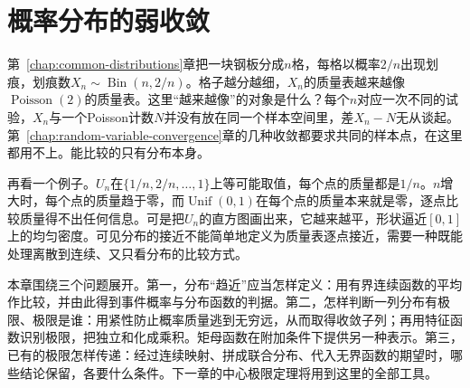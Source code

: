 \chapter{概率分布的弱收敛}
\label{chap:weak-convergence-of-distributions}

第~\ref{chap:common-distributions}章把一块钢板分成$n$格，每格以概率$2/n$出现划痕，划痕数$X_n\sim\operatorname{Bin}(n,2/n)$。格子越分越细，$X_n$的质量表越来越像$\operatorname{Poisson}(2)$的质量表。这里“越来越像”的对象是什么？每个$n$对应一次不同的试验，$X_n$与一个Poisson计数$N$并没有放在同一个样本空间里，差$X_n-N$无从谈起。第~\ref{chap:random-variable-convergence}章的几种收敛都要求共同的样本点，在这里都用不上。能比较的只有分布本身。

再看一个例子。$U_n$在$\{1/n,2/n,\dots,1\}$上等可能取值，每个点的质量都是$1/n$。$n$增大时，每个点的质量趋于零，而$\operatorname{Unif}(0,1)$在每个点的质量本来就是零，逐点比较质量得不出任何信息。可是把$U_n$的直方图画出来，它越来越平，形状逼近$[0,1]$上的均匀密度。可见分布的接近不能简单地定义为质量表逐点接近，需要一种既能处理离散到连续、又只看分布的比较方式。

本章围绕三个问题展开。第一，分布“趋近”应当怎样定义：用有界连续函数的平均作比较，并由此得到事件概率与分布函数的判据。第二，怎样判断一列分布有极限、极限是谁：用紧性防止概率质量逃到无穷远，从而取得收敛子列；再用特征函数识别极限，把独立和化成乘积。矩母函数在附加条件下提供另一种表示。第三，已有的极限怎样传递：经过连续映射、拼成联合分布、代入无界函数的期望时，哪些结论保留，各要什么条件。下一章的中心极限定理将用到这里的全部工具。


















